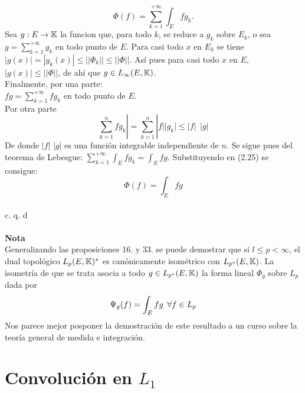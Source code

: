  \begin{equation}
 \Phi (f)= \sum_{k=1}^{+\infty}\int_E fg_k.
 \end{equation}
 Sea $g:E \rightarrow \mathbb{K}$ la funcion que, para todo $k$, se reduce a $g_k$ sobre $E_k$, o sea $g=\sum_{k=1}^{+\infty}g_k$ en todo punto de $E$. Para casi todo $x$ en $E_k$ se tiene $|g(x)|=|g_k(x)| \leq || \Phi_k || \leq || \Phi ||$. Así pues para casi todo $x$ en $E$, $|g(x)| \leq || \Phi ||$, de ahí que $g \in L_\infty (E,\mathbb{K})$. \\
 Finalmente, por una parte: \\
 
$fg=\sum_{k=1}^{+\infty}fg_k$ en todo punto de $E$. \\
Por otra parte \\
$$
\sum_{k=1}^{n}fg_k | =\sum_{k=1}^{n}|f| |g_k| \leq |f| \phantom{s} |g|
$$
De donde $|f|$ $|g|$ es una función integrable independiente de $n$. Se sigue pues del teorema de Lebesgue:  $\sum_{k=1}^{+\infty}\int_E fg_k=\int_E fg$. Substituyendo en (2.25) se consigue:
$$
\Phi (f)=\int_E fg
$$
\\
  \phantom{sssssssssssssssssssssssssssssssssss sasdasdasdasdadadssada} c. q. d \\ \\
  
\textbf{Nota}\\
Generalizando las proposiciones 16. y 33. se puede demostrar que si $l \leq p <\infty$, el dual topológico $L_p (E,\mathbb{K})^*$ es canónicamente isométrico con $L_{p^*} (E,\mathbb{K})$. La isometría  de que se trata asocia a todo $g \in L_{p^*} (E,\mathbb{K})$ la forma lineal $\Phi_g$ sobre $L_p$ dada por
$$
\Psi_g (f)=\int_E fg \phantom{s} \forall f \in L_p
$$
Nos parece mejor posponer la demostración de este resultado a un curso sobre la teoría general de medida e integración.




\chapter{Convolución en $L_1$}

